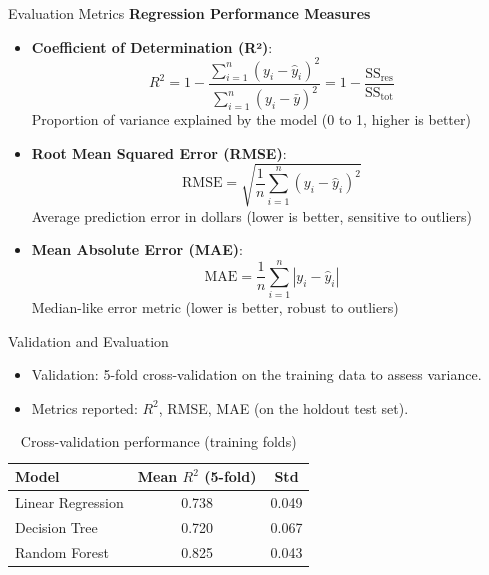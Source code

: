 \documentclass[10pt]{beamer}
\begin{document}
\begin{frame}{Evaluation Metrics}
\textbf{Regression Performance Measures}
\begin{itemize}
\item \textbf{Coefficient of Determination (R²)}:
  $$R^2 = 1 - \frac{\sum_{i=1}^{n}(y_i - \hat{y}_i)^2}{\sum_{i=1}^{n}(y_i - \bar{y})^2} = 1 - \frac{\text{SS}_{\text{res}}}{\text{SS}_{\text{tot}}}$$
  Proportion of variance explained by the model (0 to 1, higher is better)
\item \textbf{Root Mean Squared Error (RMSE)}:
  $$\text{RMSE} = \sqrt{\frac{1}{n}\sum_{i=1}^{n}(y_i - \hat{y}_i)^2}$$
  Average prediction error in dollars (lower is better, sensitive to outliers)
\item \textbf{Mean Absolute Error (MAE)}:
  $$\text{MAE} = \frac{1}{n}\sum_{i=1}^{n}|y_i - \hat{y}_i|$$
  Median-like error metric (lower is better, robust to outliers)
\end{itemize}
\end{frame}

\begin{frame}{Validation and Evaluation}
\begin{itemize}
  \item Validation: 5-fold cross-validation on the training data to assess variance.
  \item Metrics reported: $R^2$, RMSE, MAE (on the holdout test set).
\end{itemize}
\vspace{4pt}
\small
\begin{table}[h]
\centering
\begin{tabular}{@{}lcc@{}}
\toprule
Model & Mean $R^2$ (5-fold) & Std \\
\midrule
Linear Regression & 0.738 & 0.049 \\
Decision Tree & 0.720 & 0.067 \\
Random Forest & 0.825 & 0.043 \\
\bottomrule
\end{tabular}
\caption{Cross-validation performance (training folds)}
\end{table}
\end{frame}
\end{document}
